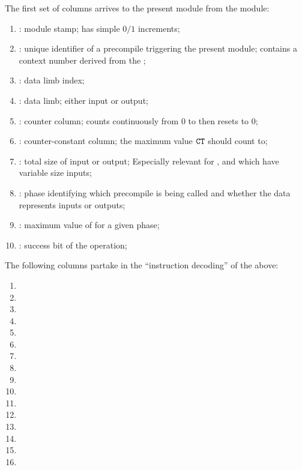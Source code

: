 The first set of columns arrives to the present module from the \mmioMod{} module:
\begin{enumerate}
    \item
        \blsStamp{}:
        module stamp; has simple $0/1$ increments;
    \item
        \blsId{}:
        unique identifier of a precompile  triggering the present module;
        contains a context number derived from the \hubStamp{};
    \item
        \blsIndex{}:
        data limb index;
    \item
        \blsLimb{}:
        data limb; either input or output;
    \item
        \ct:
        counter column;
        counts continuously from $0$ to \maxCt{} then resets to $0$;
    \item
        \maxCt:
        counter-constant column;
        the maximum value $\texttt{CT}$ should count to;
    \item
        \blsTotalSize{}:
        total size of input or output; Especially relevant for ,  and  which have variable size inputs;
    \item
        \blsPhase{}:
        phase identifying which precompile is being called and whether the data represents inputs or outputs;
    \item
        \indexMax{}:
        maximum value of \blsIndex{} for a given phase;
    \item
        \blsSuccessBit{} \hubMmuMmioBlsPrediction{} \markAsPartiallyJustifiedHere{}:
        success bit of the operation;
\end{enumerate}
The following columns partake in the ``instruction decoding'' of the above:
\begin{multicols}{2}
    \begin{enumerate}
        \item \isPointEvaluationData{}
        \item \isPointEvaluationResult{}
        \item \isBlsGOneAddData{}
        \item \isBlsGOneAddResult{}
        \item \isBlsGOneMsmData{}
        \item \isBlsGOneMsmResult{}
        \item \isBlsGTwoAddData{}
        \item \isBlsGTwoAddResult{}
        \item \isBlsGTwoMsmData{}
        \item \isBlsGTwoMsmResult{}
        \item \isBlsPairingCheckData{}
        \item \isBlsPairingCheckResult{}
        \item \isBlsMapFpToGOneData{}
        \item \isBlsMapFpToGOneResult{}
        \item \isBlsMapFpTwoToGTwoData{}
        \item \isBlsMapFpTwoToGTwoResult{}
    \end{enumerate}
\end{multicols}
